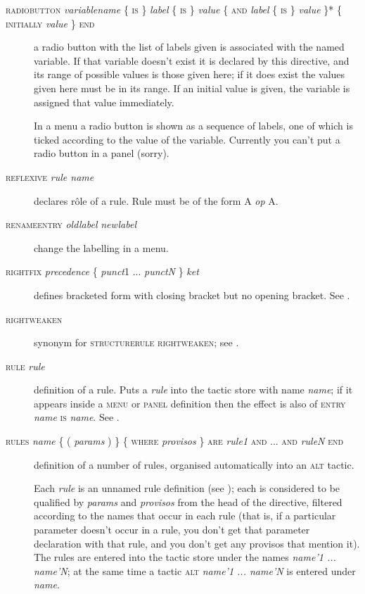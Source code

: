 \begin{description}
\item[\textsc{radiobutton} \textit{variablename} \{ \textsc{is} \} \textit{label} \{ \textsc{is} \} \textit{value} \{ \textsc{and} \textit{label} \{ \textsc{is} \} \textit{value} \}* \{ \textsc{initially} \textit{value} \} \textsc{end}] a radio button with the list of labels given is associated with the named variable. If that variable doesn't exist it is declared by this directive, and its range of possible values is those given here; if it does exist the values given here must be in its range. If an initial value is given, the variable is assigned that value immediately.

In a menu a radio button is shown as a sequence of labels, one of which is ticked according to the value of the variable. Currently you can't put a radio button in a panel (sorry).%

\item[\textsc{reflexive} \textit{rule name}] declares r\^ole of a rule. Rule must be of the form A \textit{op} A.

\item[\textsc{renameentry} \textit{oldlabel} \textit{newlabel}] change the labelling in a menu.

\item[\textsc{rightfix} \textit{precedence} \{ \textit{punct}1 ... \textit{punctN} \} \textit{ket}] defines bracketed form with closing bracket but no opening bracket. See .

\item[\textsc{rightweaken}] synonym for \textsc{structurerule} \textsc{rightweaken}; see .

\item[\textsc{rule} \textit{rule}] definition of a rule. Puts a \textit{rule} into the tactic store with name \textit{name}; if it appears inside a \textsc{menu} or \textsc{panel} definition then the effect is also of \textsc{entry} \textit{name} \textsc{is} \textit{name}. See .

\item[\textsc{rules} \textit{name} \{ ( \textit{params} ) \} \{ \textsc{where} \textit{provisos} \} \textsc{are} \textit{rule1} \textsc{and ... and} \textit{ruleN} \textsc{end}] definition of a number of rules, organised automatically into an \textsc{alt} tactic.

Each \textit{rule} is an unnamed rule definition (see ); each is considered to be qualified by \textit{params} and \textit{provisos} from the head of the directive, filtered according to the names that occur in each rule (that is, if a particular parameter doesn't occur in a rule, you don't get that parameter declaration with that rule, and you don't get any provisos that mention it). The rules are entered into the tactic store under the names \textit{name'1 ... name'N}; at the same time a tactic \textsc{alt} \textit{name'1 ... name'N} is entered under \textit{name}.


\end{description}
